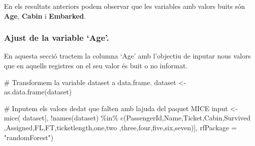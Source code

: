 \documentclass[
]{article}
\newenvironment{Shaded}{\begin{snugshade}}{\end{snugshade}}
\newcommand{\AttributeTok}[1]{\textcolor[rgb]{0.80,0.80,0.80}{#1}}
\newcommand{\CommentTok}[1]{\textcolor[rgb]{0.50,0.62,0.50}{#1}}
\newcommand{\FunctionTok}[1]{\textcolor[rgb]{0.94,0.94,0.56}{#1}}
\newcommand{\NormalTok}[1]{\textcolor[rgb]{0.80,0.80,0.80}{#1}}
\newcommand{\OtherTok}[1]{\textcolor[rgb]{0.94,0.94,0.56}{#1}}
\newcommand{\SpecialCharTok}[1]{\textcolor[rgb]{0.86,0.64,0.64}{#1}}
\newcommand{\StringTok}[1]{\textcolor[rgb]{0.80,0.58,0.58}{#1}}
\begin{document}
En els resultats anteriors podem observar que les variables amb valors
buits són \textbf{Age}, \textbf{Cabin} i \textbf{Embarked}.

\hypertarget{ajust-de-la-variable-age.}{%
\subsubsection{Ajust de la variable
`Age'.}\label{ajust-de-la-variable-age.}}

En aquesta secció tractem la columna `Age' amb l'objectiu de inputar
nous valors que en aquells registres on el seu valor és buit o no
informat.

\begin{Shaded}
\begin{Highlighting}[]
\CommentTok{\# Transformem la variable \textquotesingle{}dataset\textquotesingle{} a data.frame.}
\NormalTok{dataset }\OtherTok{\textless{}{-}} \FunctionTok{as.data.frame}\NormalTok{(dataset)}

\CommentTok{\# Inputem els valors d\textquotesingle{}edat que falten amb l\textquotesingle{}ajuda del paquet MICE}
\NormalTok{input }\OtherTok{\textless{}{-}} \FunctionTok{mice}\NormalTok{(}
\NormalTok{  dataset[, }\SpecialCharTok{!}\FunctionTok{names}\NormalTok{(dataset) }\SpecialCharTok{\%in\%}
            \FunctionTok{c}\NormalTok{(}\StringTok{\textquotesingle{}PassengerId\textquotesingle{}}\NormalTok{,}\StringTok{\textquotesingle{}Name\textquotesingle{}}\NormalTok{,}\StringTok{\textquotesingle{}Ticket\textquotesingle{}}\NormalTok{,}\StringTok{\textquotesingle{}Cabin\textquotesingle{}}\NormalTok{,}\StringTok{\textquotesingle{}Survived\textquotesingle{}}
\NormalTok{              ,}\StringTok{\textquotesingle{}Assigned\textquotesingle{}}\NormalTok{,}\StringTok{\textquotesingle{}FL\textquotesingle{}}\NormalTok{,}\StringTok{\textquotesingle{}FT\textquotesingle{}}\NormalTok{,}\StringTok{\textquotesingle{}ticketlength\textquotesingle{}}\NormalTok{,}\StringTok{\textquotesingle{}one\textquotesingle{}}\NormalTok{,}\StringTok{\textquotesingle{}two\textquotesingle{}}
\NormalTok{              ,}\StringTok{\textquotesingle{}three\textquotesingle{}}\NormalTok{,}\StringTok{\textquotesingle{}four\textquotesingle{}}\NormalTok{,}\StringTok{\textquotesingle{}five\textquotesingle{}}\NormalTok{,}\StringTok{\textquotesingle{}six\textquotesingle{}}\NormalTok{,}\StringTok{\textquotesingle{}seven\textquotesingle{}}\NormalTok{)], }\AttributeTok{rfPackage =} \StringTok{"randomForest"}\NormalTok{)}
\end{Highlighting}
\end{Shaded}
\end{document}

